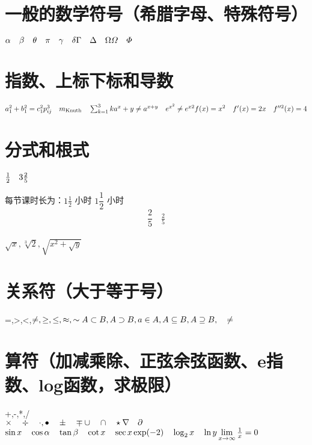 \documentclass[12pt]{article}
\begin{document}
	\section{一般的数学符号（希腊字母、特殊符号）}
	\noindent
	$\alpha \quad \beta \quad \theta \quad \pi \quad \gamma \quad \delta\\
	\Gamma \quad \Delta \quad \Omega\\
	\varOmega \quad \varPhi$
	\section{指数、上标下标和导数} 
	\noindent
	$a_1^2+b_1^2=c_1^2\\
	p_{ij}^3 \quad m_\mathrm{Knuth} \quad \sum_{k=1}^3k\\
	a^x+y \ne a^{x+y} \quad e^{x^2} \ne e^{x2}\\
	f(x)=x^2 \quad f'(x)=2x \quad f''^2(x)=4$
	
	\section{分式和根式}
	$\frac{1}{2} \quad 3\frac{2}{5}\\$
	
	每节课时长为：$1\frac{1}{2}$ 小时 \qquad $1\dfrac{1}{2}$ 小时
	\[\frac{2}{5} \quad \tfrac{2}{5}\]\\
	$\sqrt{x},\sqrt[3]{2},\sqrt{x^2+\sqrt{y}} $
	
	\section{关系符（大于等于号）}
	\noindent
	=,>,<,$\ne,\ge,\le,\approx,\sim\\
	A\subset B,A\supset B,a\in A,A\subseteq B,A\supseteq B,\quad \not= $
	
	
	\section{算符（加减乘除、正弦余弦函数、e指数、log函数，求极限）}
	\noindent
	+,-,*,/ \\
	$\times \quad \div \quad \cdot,\bullet \quad \pm \quad \mp \\
	\cup \quad \cap \quad \star \\
	\nabla \quad \partial$
	$\sin x \quad \cos \alpha \quad \tan \beta \quad \cot x \quad \sec x\\
	\exp(-2) \quad \log_2{x} \quad \ln{y}\\
	\lim\limits_{x \to \infty} \frac{1}{x}=0$
	
\end{document}
